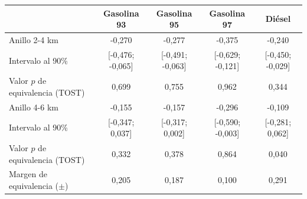 \begin{tabular}{lcccc}
\toprule
 & Gasolina 93 & Gasolina 95 & Gasolina 97 & Diésel \\
\midrule
Anillo 2-4 km & -0{,}270 & -0{,}277 & -0{,}375 & -0{,}240 \\
\quad Intervalo al 90\% & [-0{,}476; -0{,}065] & [-0{,}491; -0{,}063] & [-0{,}629; -0{,}121] & [-0{,}450; -0{,}029] \\
\quad Valor $p$ de equivalencia (TOST) & 0{,}699 & 0{,}755 & 0{,}962 & 0{,}344 \\
\addlinespace
Anillo 4-6 km & -0{,}155 & -0{,}157 & -0{,}296 & -0{,}109 \\
\quad Intervalo al 90\% & [-0{,}347; 0{,}037] & [-0{,}317; 0{,}002] & [-0{,}590; -0{,}003] & [-0{,}281; 0{,}062] \\
\quad Valor $p$ de equivalencia (TOST) & 0{,}332 & 0{,}378 & 0{,}864 & 0{,}040 \\
\addlinespace
\midrule
Margen de equivalencia ($\pm$) & 0{,}205 & 0{,}187 & 0{,}100 & 0{,}291 \\
\bottomrule
\end{tabular}
